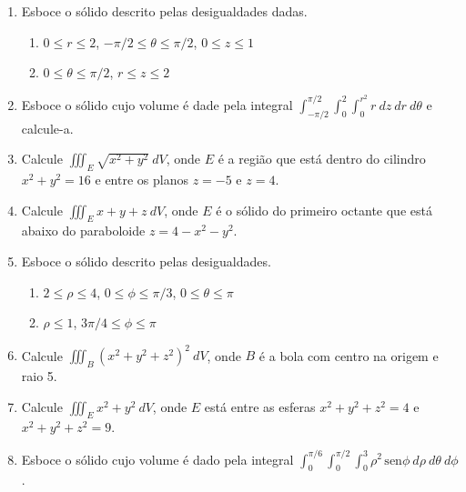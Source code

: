 \documentclass[a4paper,5pt]{amsbook}
\newcommand{\sen}{\,\mbox{sen}}
\newcommand{\ds}{\displaystyle}
\begin{document}
\vspace{1cm}
\begin{enumerate}
    \setlength\itemsep{0.5cm}
    \item Esboce o s\'olido descrito pelas desigualdades dadas.
        \begin{enumerate}
            \setlength\itemsep{0.3cm}
            \item $0\le r\le 2$, $-\pi/2\le \theta\le \pi/2$, $0\le z\le 1$
            \item $0\le \theta\le \pi/2$, $r\le z\le 2$
        \end{enumerate}

    \item Esboce o s\'olido cujo volume \'e dade pela integral
    $\ds\int_{-\pi/2}^{\pi/2} \int_0^2 \int_0^{r^2} r\ dz\ dr\ d\theta$ e
    calcule-a.

    \item Calcule $\ds\iiint_E \sqrt{x^2+y^2}\ dV$, onde $E$ \'e a regi\~ao que
    est\'a dentro do cilindro $x^2+y^2=16$ e entre os planos $z=-5$ e $z=4$.

    \item Calcule $\ds\iiint_E x+y+z\ dV$, onde $E$ \'e o s\'olido do primeiro
    octante que est\'a abaixo do paraboloide $z=4-x^2-y^2$.


    \item Esboce o s\'olido descrito pelas desigualdades.
        \begin{enumerate}
            \setlength\itemsep{0.3cm}
            \item $2\le \rho\le 4$, $0\le \phi\le \pi/3$, $0\le \theta\le \pi$
            \item $\rho\le 1$, $3\pi/4\le \phi\le \pi$
        \end{enumerate}
        
    \item Calcule $\ds\iiint_B (x^2+y^2+z^2)^2\ dV$, onde $B$ \'e a bola com
    centro na origem e raio 5.

    \item Calcule $\iiint_E x^2+y^2\ dV$, onde $E$ est\'a entre as esferas
    $x^2+y^2+z^2=4$ e $x^2+y^2+z^2=9$.

    \item Esboce o s\'olido cujo volume \'e dado pela integral $\ds\int_0^{\pi/6}
    \int_0^{\pi/2} \int_0^3 \rho^2\sen\phi\ d\rho\ d\theta\ d\phi$.

\end{enumerate}
\end{document}
